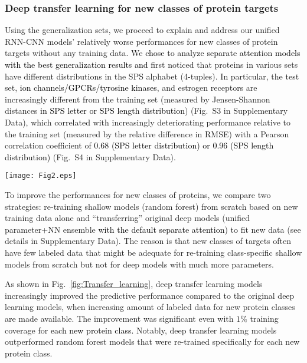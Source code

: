\documentclass[nocrop]{bioinfo}
\newcommand{\red}[1]{\textcolor{black}{#1}}
\begin{document}
\vspace{-1em}
\subsubsection{Deep transfer learning for new classes of protein targets} 

Using the generalization sets, we proceed to explain and address our unified RNN-CNN models' relatively worse performances for new classes of protein targets without any training data. We \red{chose to analyze separate attention models with the best generalization results and} first noticed that proteins in various sets have different distributions in the SPS alphabet (4-tuples). In particular, the test set, \red{ion channels/GPCRs/tyrosine kinases}, and estrogen receptors are increasingly different from the training set  (measured by Jensen-Shannon distances \red{in SPS letter or SPS length distribution}) (Fig.~S3 in Supplementary Data), which correlated with increasingly deteriorating performance relative to the training set  (measured by the relative difference in RMSE) with a Pearson correlation coefficient of \red{0.68 (SPS letter distribution) or 0.96 (SPS length distribution)} (Fig.~S4 in Supplementary Data).  

\begin{figure*}[!htb]
    \centering
\texttt{[image: Fig2.eps]}
    \caption{\red{Comparing  strategies to generalize predictions for four sets of new protein classes: original random forest (RF), original param.+NN ensemble of unified RNN-CNN models (DL for deep learning with the default attention), and re-trained RF or transfer DL using incremental amounts of labeled data in each set.}}
    \label{fig:Transfer_learning}
\end{figure*}
 
To improve the performances for new classes of proteins, we compare two strategies: re-training shallow models  (random forest) from scratch based on new training data alone and ``transferring'' original deep models  (unified parameter+NN ensemble \red{with the default separate attention}) to fit new data  (see details in Supplementary Data). The reason is that new classes of targets often have few labeled data that might be adequate for re-training class-specific shallow models from scratch but not for deep models with much more parameters. 




As shown in Fig.~\ref{fig:Transfer_learning}, deep transfer learning models increasingly improved the predictive performance compared to the original deep learning models, when increasing amount of labeled data for new protein classes are made available.  The improvement was significant even with  $1\%$ training coverage for \red{each new protein class.} Notably, deep transfer learning models outperformed random forest models that were re-trained specifically for each new protein class.  
\end{document}
